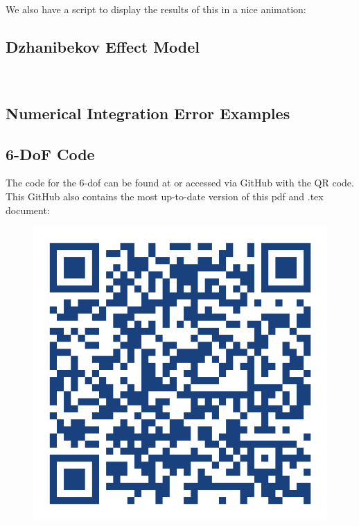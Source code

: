 \documentclass[12pt]{report}
\begin{document}
We also have a script to display the results of this in a nice animation:

\label{code:LorenzAnim}
\subsection{Dzhanibekov Effect Model}
\label{code:DzhanMain}

\label{code:DzhanInt}

\label{code:DzhanRotVis}\


\subsection{Numerical Integration Error Examples}
\label{code:Numerical Error $y'=2t$}

\label{code:Numerical Error y'=cos(4*pi*t)}
\subsection{6-DoF Code}
The code for the 6-\gls{dof} can be found at \cite{reynolds_hudsonreynoldsflight-dynamics-bible_2025} or accessed via GitHub with the QR code. This GitHub also contains the most up-to-date version of this pdf and .tex document:

\begin{figure}[ht]
    \centering
    \includegraphics[width=0.5\linewidth]{Images/adobe-express-qr-code(1).png}
    \label{fig:qr code}
\end{figure}

\printglossary[title=Special Terms, toctitle = Special Terms]

\printbibliography[heading=bibintoc, title={References}]
\end{document}
